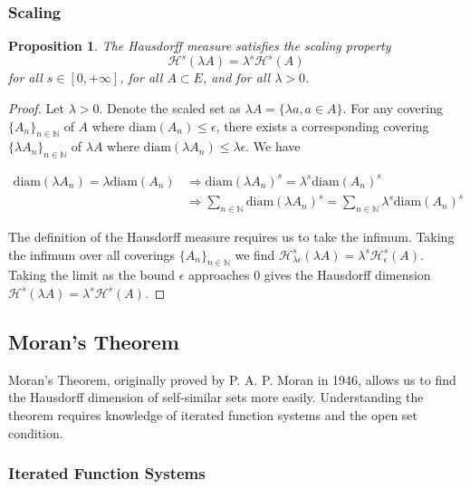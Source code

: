 \documentclass{article}
\newtheorem{proposition}{Proposition}
\begin{document}
\subsubsection{Scaling}

\begin{proposition}
    The Hausdorff measure satisfies the scaling property
    $$\mathcal{H}^{s}(\lambda A) = \lambda^{s} \mathcal{H}^{s}(A)$$
    for all $s \in [0, +\infty]$, for all $A \subset E$, and for all $\lambda > 0$.
\end{proposition}

\begin{proof}
    Let $\lambda > 0$. Denote the scaled set as $\lambda A = \{ \lambda a, a\in A \}$. For any covering $\{A_n\}_{n \in \mathbb{N}}$ of $A$ where $\text{diam}(A_n) \leq \epsilon$, there exists a corresponding covering $\{\lambda A_n\}_{n \in \mathbb{N}}$ of $\lambda A$ where $\text{diam}(\lambda A_n) \leq \lambda \epsilon$. We have 

\begin{align*}
    \text{diam}(\lambda A_n) = \lambda \text{diam}(A_n) &\Rightarrow \text{diam} (\lambda A_n)^{s} = \lambda^{s} \text{diam} (A_n)^{s} \\
    &\Rightarrow \sum_{n \in \mathbb{N}} \text{diam} (\lambda A_n)^{s} = \sum_{n \in \mathbb{N}} \lambda^{s} \text{diam}(A_n)^{s}
\end{align*}

The definition of the Hausdorff measure requires us to take the infimum. Taking the infimum over all coverings $\{A_n \}_{n \in \mathbb{N}}$ we find $\mathcal{H}_{\lambda \epsilon}^{s} (\lambda A) = \lambda^{s} \mathcal{H}_{\epsilon}^{s} (A)$. Taking the limit as the bound $\epsilon$ approaches $0$ gives the Hausdorff dimension $\mathcal{H}^{s}(\lambda A) = \lambda^{s} \mathcal{H}^{s} (A)$.

\end{proof}




\subsection{Moran's Theorem}
Moran's Theorem, originally proved by P. A. P. Moran in 1946, allows us to find the Hausdorff dimension of self-similar sets more easily. Understanding the theorem requires knowledge of iterated function systems and the open set condition.
\subsubsection{Iterated Function Systems}
\end{document}
